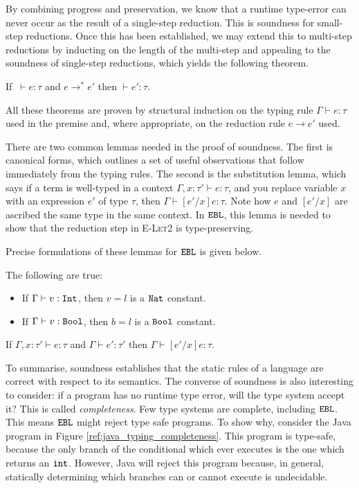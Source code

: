 By combining progress and preservation, we know that a runtime type-error can never occur as the result of a single-step reduction. This is soundness for small-step reductions. Once this has been established, we may extend this to multi-step reductions by inducting on the length of the multi-step and appealing to the soundness of single-step reductions, which yields the following theorem.

\begin{theorem}
If $~\vdash e: \tau$ and $e \longrightarrow^{*} e'$ then $\vdash e': \tau$.
\end{theorem}

All these theorems are proven by structural induction on the typing rule $\Gamma \vdash e: \tau$ used in the premise and, where appropriate, on the reduction rule $e \longrightarrow e'$ used.

There are two common lemmas needed in the proof of soundness. The first is canonical forms, which outlines a set of useful observations that follow immediately from the typing rules. The second is the substitution lemma, which says if a term is well-typed in a context $\Gamma, x: \tau' \vdash e: \tau$, and you replace variable $x$ with an expression $e'$ of type $\tau$, then $\Gamma \vdash [e'/x]e: \tau$. Note how $e$ and $[e'/x]$ are ascribed the same type in the same context. In $\mathtt{EBL}$, this lemma is needed to show that the reduction step in \textsc{E-Let2} is type-preserving.

Precise formulations of these lemmas for $\mathtt{EBL}$ is given below.

\begin{lemma}
The following are true:
\begin{itemize}
	\setlength\itemsep{-0.7em}
	\item If $\Gamma \vdash v: \mathtt{Int}$, then $v = l$ is a $\mathtt{Nat}$ constant.
	\item If $\Gamma \vdash v: \mathtt{Bool}$, then $b = l$ is a $\mathtt{Bool}$ constant.
\end{itemize}
\end{lemma}

\begin{lemma}[Substitution]
If $\Gamma, x: \tau' \vdash e: \tau$ and $\Gamma \vdash e': \tau'$ then $\Gamma \vdash [e'/x]e:  \tau$.
\end{lemma}

To summarise, soundness establishes that the static rules of a language are correct with respect to its semantics. The converse of soundness is also interesting to consider: if a program has no runtime type error, will the type system accept it? This is called \textit{completeness}. Few type systems are complete, including $\mathtt{EBL}$. This means $\mathtt{EBL}$ might reject type safe programs. To show why, consider the Java program in Figure \ref{ref:java_typing_completeness}. This program is type-safe, because the only branch of the conditional which ever executes is the one which returns an $\mathtt{int}$. However, Java will reject this program because, in general, statically determining which branches can or cannot execute is undecidable.

